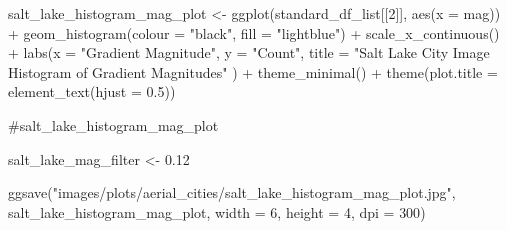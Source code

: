 \documentclass[
  letterpaper,
  DIV=11,
  numbers=noendperiod]{scrreprt}
\newenvironment{Shaded}{\begin{snugshade}}{\end{snugshade}}
\newcommand{\AttributeTok}[1]{\textcolor[rgb]{0.40,0.45,0.13}{#1}}
\newcommand{\CommentTok}[1]{\textcolor[rgb]{0.37,0.37,0.37}{#1}}
\newcommand{\DecValTok}[1]{\textcolor[rgb]{0.68,0.00,0.00}{#1}}
\newcommand{\FloatTok}[1]{\textcolor[rgb]{0.68,0.00,0.00}{#1}}
\newcommand{\FunctionTok}[1]{\textcolor[rgb]{0.28,0.35,0.67}{#1}}
\newcommand{\NormalTok}[1]{\textcolor[rgb]{0.00,0.23,0.31}{#1}}
\newcommand{\OtherTok}[1]{\textcolor[rgb]{0.00,0.23,0.31}{#1}}
\newcommand{\SpecialCharTok}[1]{\textcolor[rgb]{0.37,0.37,0.37}{#1}}
\newcommand{\StringTok}[1]{\textcolor[rgb]{0.13,0.47,0.30}{#1}}
\begin{document}
\begin{Shaded}
\begin{Highlighting}[]
\NormalTok{salt\_lake\_histogram\_mag\_plot }\OtherTok{\textless{}{-}}
  \FunctionTok{ggplot}\NormalTok{(standard\_df\_list[[}\DecValTok{2}\NormalTok{]], }
         \FunctionTok{aes}\NormalTok{(}\AttributeTok{x =}\NormalTok{ mag)) }\SpecialCharTok{+}
  \FunctionTok{geom\_histogram}\NormalTok{(}\AttributeTok{colour =} \StringTok{"black"}\NormalTok{, }\AttributeTok{fill =} \StringTok{"lightblue"}\NormalTok{) }\SpecialCharTok{+}
  \FunctionTok{scale\_x\_continuous}\NormalTok{() }\SpecialCharTok{+} 
  \FunctionTok{labs}\NormalTok{(}\AttributeTok{x =} \StringTok{"Gradient Magnitude"}\NormalTok{, }
       \AttributeTok{y =} \StringTok{"Count"}\NormalTok{, }
       \AttributeTok{title =} \StringTok{"Salt Lake City Image Histogram of Gradient Magnitudes"}
\NormalTok{       ) }\SpecialCharTok{+}
  \FunctionTok{theme\_minimal}\NormalTok{() }\SpecialCharTok{+}
  \FunctionTok{theme}\NormalTok{(}\AttributeTok{plot.title =} \FunctionTok{element\_text}\NormalTok{(}\AttributeTok{hjust =} \FloatTok{0.5}\NormalTok{))}

\CommentTok{\#salt\_lake\_histogram\_mag\_plot}

\NormalTok{salt\_lake\_mag\_filter }\OtherTok{\textless{}{-}} \FloatTok{0.12}

\FunctionTok{ggsave}\NormalTok{(}\StringTok{"images/plots/aerial\_cities/salt\_lake\_histogram\_mag\_plot.jpg"}\NormalTok{, salt\_lake\_histogram\_mag\_plot, }\AttributeTok{width =} \DecValTok{6}\NormalTok{, }\AttributeTok{height =} \DecValTok{4}\NormalTok{, }\AttributeTok{dpi =} \DecValTok{300}\NormalTok{)}
\end{Highlighting}
\end{Shaded}
\end{document}
